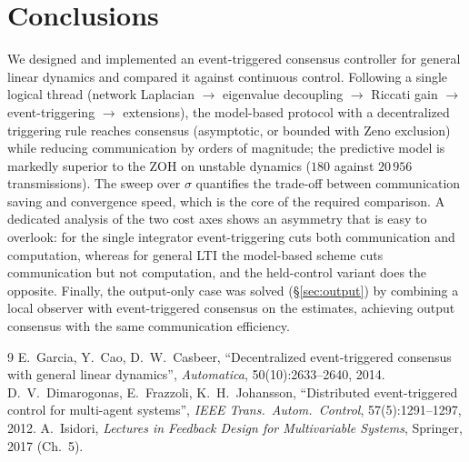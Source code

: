 \documentclass[11pt,a4paper]{article}
\theoremstyle{remark}
\begin{document}
\section{Conclusions}
We designed and implemented an event-triggered consensus controller for general linear dynamics and
compared it against continuous control. Following a single logical thread (network Laplacian
$\to$ eigenvalue decoupling $\to$ Riccati gain $\to$ event-triggering $\to$ extensions), the
model-based protocol with a decentralized triggering rule reaches consensus (asymptotic, or bounded
with Zeno exclusion) while reducing communication by orders of magnitude; the predictive model is
markedly superior to the ZOH on unstable dynamics ($180$ against $20\,956$ transmissions). The sweep over
$\sigma$ quantifies the trade-off between communication saving and convergence speed, which is the
core of the required comparison. A dedicated analysis of the two cost axes shows an asymmetry that
is easy to overlook: for the single integrator event-triggering cuts both communication and
computation, whereas for general LTI the model-based scheme cuts communication but not computation,
and the held-control variant does the opposite. Finally, the output-only case was solved
(\S\ref{sec:output}) by combining a local observer with event-triggered consensus on the estimates,
achieving output consensus with the same communication efficiency.

\begin{thebibliography}{9}
 E.~Garcia, Y.~Cao, D.~W.~Casbeer,
``Decentralized event-triggered consensus with general linear dynamics'',
\emph{Automatica}, 50(10):2633--2640, 2014.
 D.~V.~Dimarogonas, E.~Frazzoli, K.~H.~Johansson,
``Distributed event-triggered control for multi-agent systems'',
\emph{IEEE Trans.\ Autom.\ Control}, 57(5):1291--1297, 2012.
 A.~Isidori,
\emph{Lectures in Feedback Design for Multivariable Systems},
Springer, 2017 (Ch.~5).
\end{thebibliography}
\end{document}

